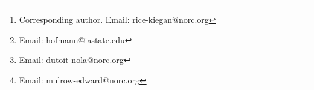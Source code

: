 \author[1]{Kiegan Rice\thanks{Corresponding author. Email: rice-kiegan@norc.org}}
\author[2]{Heike Hofmann\footnote{Email: hofmann@iastate.edu}}
\author[1]{Nola du Toit\footnote{Email: dutoit-nola@norc.org}} 
\author[1]{Edward Mulrow\footnote{Email: mulrow-edward@norc.org}}
